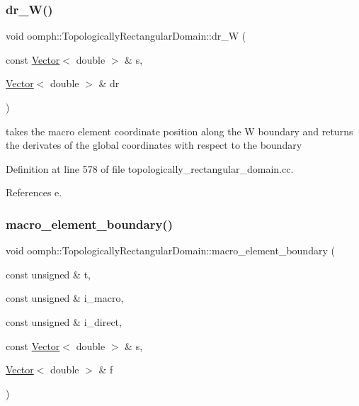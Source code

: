 \subsubsection{\texorpdfstring{dr\+\_\+\+W()}{dr\_W()}}
{\footnotesize\ttfamily void oomph\+::\+Topologically\+Rectangular\+Domain\+::dr\+\_\+W (\begin{DoxyParamCaption}\item[{const \hyperlink{classoomph_1_1Vector}{Vector}$<$ double $>$ \&}]{s,  }\item[{\hyperlink{classoomph_1_1Vector}{Vector}$<$ double $>$ \&}]{dr }\end{DoxyParamCaption})\hspace{0.3cm}{\ttfamily [private]}}



takes the macro element coordinate position along the W boundary and returns the derivates of the global coordinates with respect to the boundary 



Definition at line 578 of file topologically\+\_\+rectangular\+\_\+domain.\+cc.



References e.

\mbox{\label{classoomph_1_1TopologicallyRectangularDomain_a4de4d505233303cee0690ee87e45b4cf}} 
\subsubsection{\texorpdfstring{macro\+\_\+element\+\_\+boundary()}{macro\_element\_boundary()}}
{\footnotesize\ttfamily void oomph\+::\+Topologically\+Rectangular\+Domain\+::macro\+\_\+element\+\_\+boundary (\begin{DoxyParamCaption}\item[{const unsigned \&}]{t,  }\item[{const unsigned \&}]{i\+\_\+macro,  }\item[{const unsigned \&}]{i\+\_\+direct,  }\item[{const \hyperlink{classoomph_1_1Vector}{Vector}$<$ double $>$ \&}]{s,  }\item[{\hyperlink{classoomph_1_1Vector}{Vector}$<$ double $>$ \&}]{f }\end{DoxyParamCaption})\hspace{0.3cm}{\ttfamily [virtual]}}

